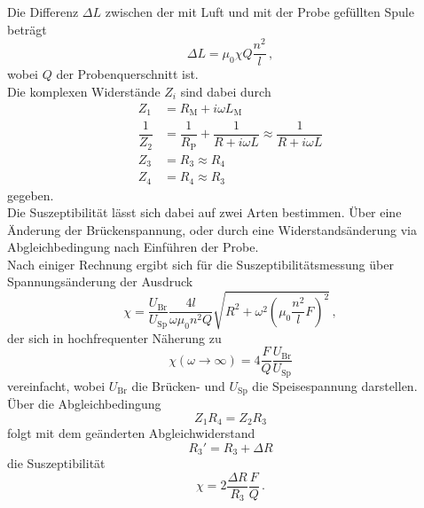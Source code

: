 Die Differenz $\Delta L$ zwischen der mit Luft und mit der Probe gefüllten Spule beträgt
\begin{equation}
    \Delta L = \mu_0 \chi Q \dfrac{n^2}{l} \,,
\end{equation}
wobei $Q$ der Probenquerschnitt ist. \\

Die komplexen Widerstände $Z_i$ sind dabei durch
\begin{align*}
    Z_1             &= R_\text{M} + i \omega L_\text{M} \\
    \dfrac{1}{Z_2}  &= \dfrac{1}{R_\text{P}} + \dfrac{1}{R + i \omega L} \approx \dfrac{1}{ R + i \omega L}\\
    Z_3             &= R_3                                               \approx R_4\\
    Z_4             &= R_4                                               \approx R_3
\end{align*}
gegeben. \\

Die Suszeptibilität lässt sich dabei auf zwei Arten bestimmen.
Über eine Änderung der Brückenspannung, oder durch eine Widerstandsänderung via Abgleichbedingung nach Einführen der Probe. \\

Nach einiger Rechnung ergibt sich für die Suszeptibilitätsmessung über Spannungsänderung der Ausdruck
\begin{equation}
    \chi = \dfrac{U_\text{Br}}{U_\text{Sp}} \dfrac{4 l}{\omega \mu_0 n^2 Q} \sqrt{R^2 + \omega^2 \left(\mu_0 \dfrac{n^2}{l} F \right)^2} \,,
    \label{eq:spannsusamogus}
\end{equation}
der sich in hochfrequenter Näherung zu
\begin{equation}
    \chi(\omega \rightarrow \infty) = 4 \dfrac{F}{Q} \dfrac{U_\text{Br}}{U_\text{Sp}}
    \label{eq:spannsussimp}
\end{equation}
vereinfacht, wobei $U_\text{Br}$ die Brücken- und $U_\text{Sp}$ die Speisespannung darstellen. \\

Über die Abgleichbedingung 
\begin{equation*}
    Z_1 R_4 = Z_2 R_3
\end{equation*}
folgt mit dem geänderten Abgleichwiderstand
\begin{equation*}
    R_3' = R_3 + \Delta R
\end{equation*}
die Suszeptibilität
\begin{equation}
    \chi = 2 \dfrac{\Delta R}{R_3} \dfrac{F}{Q} \,.
    \label{eq:widsus}
\end{equation}




